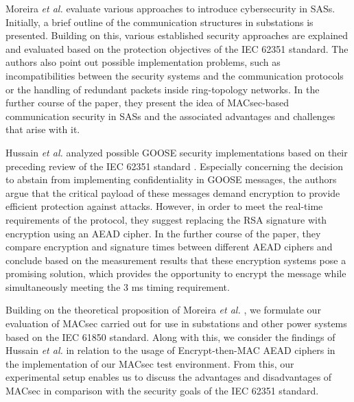 \documentclass[conference, onecolumn, a4paper]{IEEEtran}
\begin{document}
\smallskip
Moreira \textit{et al.} \cite{Cybersecurity_Substation:2016} evaluate various approaches to introduce cybersecurity in SASs. Initially, a brief outline 
of the communication structures in substations is presented. Building on this, various established security approaches are explained and evaluated based 
on the protection objectives of the IEC 62351 standard. The authors also point out possible implementation problems, such as incompatibilities between 
the security systems and the communication protocols or the handling of redundant packets inside ring-topology networks. In the further course of the 
paper, they present the idea of MACsec-based communication security in SASs and the associated advantages and challenges that arise with it. 

\smallskip
Hussain \textit{et al.} \cite{GOOSE_confidentiality_integrity:2020} analyzed possible GOOSE security implementations based on their preceding review 
of the IEC 62351 standard \cite{Review_IEC62351:2019}. Especially concerning the decision to abstain from implementing confidentiality in GOOSE messages, 
the authors argue that the critical payload of these messages demand encryption to provide efficient protection against attacks. However, in order to 
meet the real-time requirements of the protocol, they suggest replacing the RSA signature with encryption using an AEAD cipher. In the further course 
of the paper, they compare encryption and signature times between different AEAD ciphers and conclude based on the measurement results that these encryption 
systems pose a promising solution, which provides the opportunity to encrypt the message while simultaneously  meeting the 3 ms timing requirement.

\smallskip 
Building on the theoretical proposition of Moreira \textit{et al.} \cite{Cybersecurity_Substation:2016}, we formulate our evaluation of MACsec carried 
out for use in substations and other power systems based on the IEC 61850 standard. Along with this, we consider the findings of Hussain \textit{et al.} 
\cite{GOOSE_confidentiality_integrity:2020} in relation to the usage of Encrypt-then-MAC AEAD ciphers in the implementation of our MACsec test environment. 
From this, our experimental setup enables us to discuss the advantages and disadvantages of MACsec in comparison with the security goals of the IEC 62351 
standard. 

\end{document}
